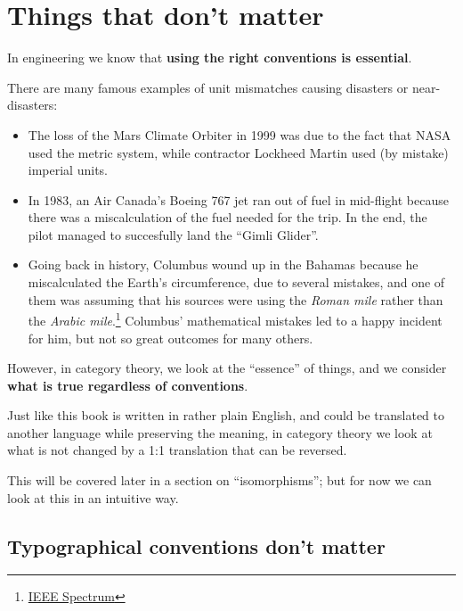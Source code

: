 

\section{Things that don't matter}

In engineering we know that \textbf{using the right conventions is essential}.

There are many famous examples of unit mismatches causing disasters or near-disasters:
\begin{itemize}
  \item The loss of the Mars Climate Orbiter in 1999 was due to the fact that NASA used the metric system,
  while contractor Lockheed Martin used (by mistake) imperial units.
  \item In 1983, an Air Canada’s Boeing 767 jet ran out of fuel in mid-flight because
  there was a miscalculation of the fuel needed for the trip. In the end, the pilot managed to succesfully land the ``Gimli Glider''.
  \item
  Going back in history, Columbus wound up in the Bahamas because he miscalculated
  the Earth's circumference, due to several mistakes, and one of them was assuming
  that his sources were using the \emph{Roman mile} rather than the \emph{Arabic mile}.\footnote{
    \href{https://spectrum.ieee.org/tech-talk/at-work/test-and-measurement/columbuss-geographical-miscalculations}{IEEE Spectrum}
  }
  Columbus' mathematical mistakes led to a happy incident for him, but not so great outcomes for many others.
\end{itemize}

However, in category theory, we look at the ``essence'' of things, and we consider \textbf{what is true regardless of conventions}.

Just like this book is written in rather plain English, and could be translated to another language while preserving the meaning, in category theory we look at what is not changed by a 1:1 translation that can be reversed.

This will be covered later in a section on ``isomorphisms''; but for now we can look at this in an intuitive way.

\subsection{Typographical conventions don't matter}

